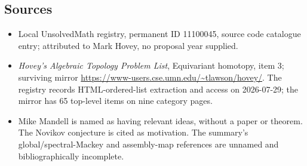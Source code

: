 \documentclass[11pt]{article}
\begin{document}
\subsection{Sources}
\begin{itemize}
\item Local UnsolvedMath registry, permanent ID 11100045, source code catalogue entry; attributed to Mark Hovey, no proposal year supplied.
\item \emph{Hovey's Algebraic Topology Problem List}, Equivariant homotopy, item 3; surviving mirror \url{https://www-users.cse.umn.edu/~tlawson/hovey/}. The registry records HTML-ordered-list extraction and access on 2026-07-29; the mirror has 65 top-level items on nine category pages.
\item Mike Mandell is named as having relevant ideas, without a paper or theorem. The Novikov conjecture is cited as motivation. The summary's global/spectral-Mackey and assembly-map references are unnamed and bibliographically incomplete.
\end{itemize}
\end{document}
